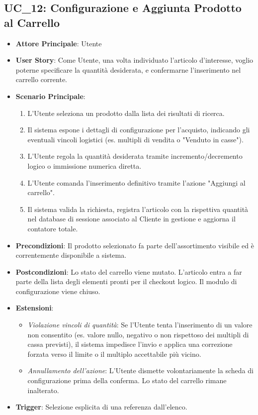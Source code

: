\subsection{UC\_12: Configurazione e Aggiunta Prodotto al Carrello}
\label{uc_12}

\begin{itemize}
    \item \textbf{Attore Principale}: Utente
    \item \textbf{User Story}: Come Utente, una volta individuato l'articolo d'interesse, voglio poterne specificare la quantità desiderata, e confermarne l'inserimento nel carrello corrente.
    \item \textbf{Scenario Principale}: 
    \begin{enumerate}
        \item L'Utente seleziona un prodotto dalla lista dei risultati di ricerca.
        \item Il sistema espone i dettagli di configurazione per l'acquisto, indicando gli eventuali vincoli logistici (es. multipli di vendita o "Venduto in casse").
        \item L'Utente regola la quantità desiderata tramite incremento/decremento logico o immissione numerica diretta.
        \item L'Utente comanda l'inserimento definitivo tramite l'azione "Aggiungi al carrello".
        \item Il sistema valida la richiesta, registra l'articolo con la rispettiva quantità nel database di sessione associato al Cliente in gestione e aggiorna il contatore totale.
    \end{enumerate}
    \item \textbf{Precondizioni}: Il prodotto selezionato fa parte dell'assortimento visibile ed è correntemente disponibile a sistema.
    \item \textbf{Postcondizioni}: Lo stato del carrello viene mutato. L'articolo entra a far parte della lista degli elementi pronti per il checkout logico. Il modulo di configurazione viene chiuso.
    \item \textbf{Estensioni}:
    \begin{itemize}
        \item \textit{Violazione vincoli di quantità}: Se l'Utente tenta l'inserimento di un valore non consentito (es. valore nullo, negativo o non rispettoso dei multipli di cassa previsti), il sistema impedisce l'invio e applica una correzione forzata verso il limite o il multiplo accettabile più vicino.
        \item \textit{Annullamento dell'azione}: L'Utente dismette volontariamente la scheda di configurazione prima della conferma. Lo stato del carrello rimane inalterato.
    \end{itemize}
    \item \textbf{Trigger}: Selezione esplicita di una referenza dall'elenco.
\end{itemize}

